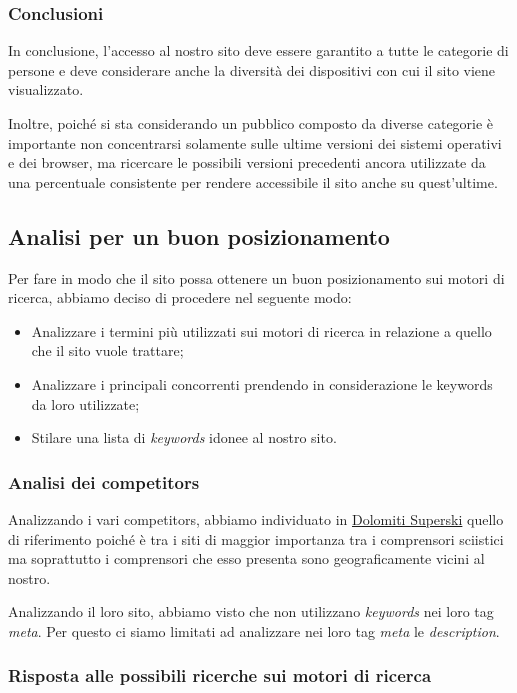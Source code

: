 \subsubsection{Conclusioni}

In conclusione, l'accesso al nostro sito deve essere garantito a tutte le categorie di persone e deve considerare anche la diversità
dei dispositivi con cui il sito viene visualizzato.

Inoltre, poiché si sta considerando un pubblico composto da diverse categorie è importante non concentrarsi solamente sulle ultime versioni
dei sistemi operativi e dei browser, ma ricercare le possibili versioni precedenti ancora utilizzate da una percentuale consistente per rendere
accessibile il sito anche su quest'ultime.

\subsection{Analisi per un buon posizionamento}

Per fare in modo che il sito possa ottenere un buon posizionamento sui motori di ricerca, abbiamo deciso di procedere nel seguente modo:
\begin{itemize}
    \item Analizzare i termini più utilizzati sui motori di ricerca in relazione a quello che il sito vuole trattare;
    \item Analizzare i principali concorrenti prendendo in considerazione le keywords da loro utilizzate;
    \item Stilare una lista di \textit{keywords} idonee al nostro sito.
\end{itemize}

\subsubsection{Analisi dei competitors}

Analizzando i vari competitors, abbiamo individuato in \href{www.dolomitisuperski.com}{Dolomiti Superski} quello di riferimento poiché è tra i siti di maggior 
importanza tra i comprensori sciistici ma soprattutto i comprensori che esso presenta sono geograficamente vicini al nostro.

Analizzando il loro sito, abbiamo visto che non utilizzano \textit{keywords} nei loro tag \textit{meta}. Per questo ci siamo limitati ad analizzare nei loro
tag \textit{meta} le \textit{description}.

\subsubsection{Risposta alle possibili ricerche sui motori di ricerca}

